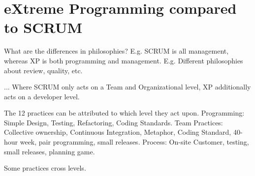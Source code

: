 \section{eXtreme Programming compared to SCRUM}
What are the differences in philosophies?
E.g. SCRUM is all management, whereas XP is both programming and management.
E.g. Different philosophies about review, quality, etc.






...
Where SCRUM only acts on a Team and Organizational level, XP additionally acts on a developer level.

The 12 practices can be attributed to which level they act upon.
Programming: Simple Design, Testing, Refactoring, Coding Standards.
Team Practices: Collective ownership, Continuous Integration, Metaphor, Coding Standard, 40-hour week, pair programming, small releases.
Process: On-site Customer, testing, small releases, planning game.

Some practices cross levels.